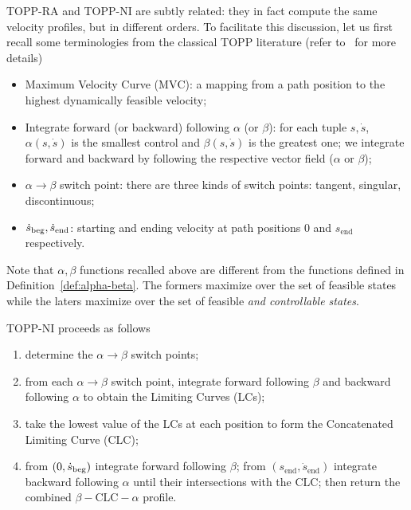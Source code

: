 \documentclass[journal]{IEEEtran}
\theoremstyle{plain}
\theoremstyle{definition}
\theoremstyle{definition}
\newcommand{\rmend}{\mathrm{end}}
\newcommand{\MVC}{\mathrm{MVC}}
\newcommand{\CLC}{\mathrm{CLC}}
\newcommand{\LC}{\mathrm{LC}}
\begin{document}
TOPP-RA and TOPP-NI are subtly related: they in fact compute the same
velocity profiles, but in different orders.  To facilitate this
discussion, let us first recall some terminologies from the classical
TOPP literature (refer to~\cite{pham2014general} for more details)
\begin{itemize}
\item Maximum Velocity Curve ($\MVC$): a mapping from a path position
  to the highest dynamically feasible velocity;
\item Integrate forward (or backward) following $\alpha$ (or $\beta$):
  for each tuple $s, \dot s$, $\alpha(s, \dot s)$ is the smallest
  control and $\beta(s, \dot s)$ is the greatest one; we integrate
  forward and backward by following the respective vector field
  ($\alpha$ or $\beta$);
\item $\alpha \rightarrow \beta$ switch point: there are three kinds
  of switch points: tangent, singular, discontinuous;
\item $\dot {s}_{\rm{beg}}, \dot s_{\rmend}$: starting and ending
  velocity at path positions $0$ and $ s_{\rmend}$ respectively.
\end{itemize}
Note that $\alpha, \beta$ functions recalled above are different from the
functions defined in Definition~\ref{def:alpha-beta}. The formers
maximize over the set of feasible states while the laters maximize
over the set of feasible \emph{and controllable states}.

TOPP-NI proceeds as follows
\begin{enumerate}
\item determine the  $\alpha\rightarrow\beta$ switch points;
\item from each $\alpha\rightarrow\beta$ switch point, integrate
  forward following $\beta$ and backward following $\alpha$ to obtain
  the Limiting Curves ($\LC$s);
\item take the lowest value of the $\LC$s at each position to form
  the Concatenated Limiting Curve ($\CLC$);
\item from $(0, \dot s_{\rm{beg}})$ integrate forward following
  $\beta$; from $(s_\rmend, \dot s_\rmend)$ integrate backward
  following $\alpha$ until their intersections with the $\CLC$; then
  return the combined $\beta-\CLC-\alpha$ profile.
\end{enumerate}
\end{document}
